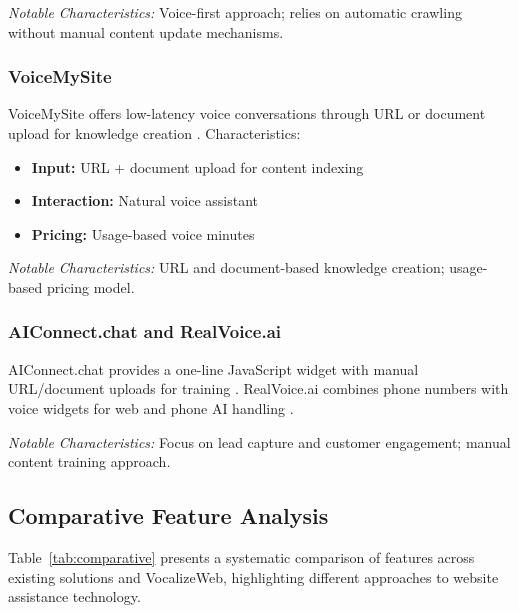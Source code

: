 \textit{Notable Characteristics:} Voice-first approach; relies on automatic crawling without manual content update mechanisms.

\subsubsection{VoiceMySite}

VoiceMySite offers low-latency voice conversations through URL or document upload for knowledge creation \cite{voicemysite}. Characteristics:

\begin{itemize}[leftmargin=*]
    \item \textbf{Input:} URL + document upload for content indexing
    \item \textbf{Interaction:} Natural voice assistant
    \item \textbf{Pricing:} Usage-based voice minutes
\end{itemize}

\textit{Notable Characteristics:} URL and document-based knowledge creation; usage-based pricing model.

\subsubsection{AIConnect.chat and RealVoice.ai}

AIConnect.chat provides a one-line JavaScript widget with manual URL/document uploads for training \cite{aiconnect}. RealVoice.ai combines phone numbers with voice widgets for web and phone AI handling \cite{realvoice}.

\textit{Notable Characteristics:} Focus on lead capture and customer engagement; manual content training approach.

\subsection{Comparative Feature Analysis}

Table~\ref{tab:comparative} presents a systematic comparison of features across existing solutions and VocalizeWeb, highlighting different approaches to website assistance technology.


